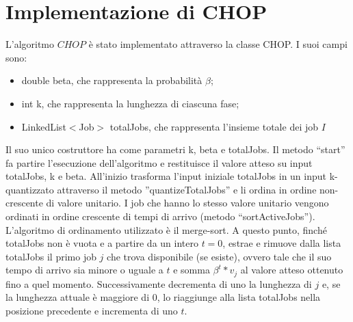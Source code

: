 \documentclass[twoside,openany,titlepage,fleqn,
	headinclude,12pt,a4paper,BCOR5mm,footinclude]{scrbook}
\begin{document}
\section{Implementazione di CHOP}
L’algoritmo $CHOP$ è stato implementato attraverso la classe CHOP. I suoi campi sono:
\begin{itemize}
\item{double beta, che rappresenta la probabilità $\beta$;}
\item{int k, che rappresenta la lunghezza di ciascuna fase;}
\item{LinkedList$<$Job$>$ totalJobs, che rappresenta l’insieme totale dei job $I$}
\end{itemize}
Il suo unico costruttore ha come parametri k, beta e totalJobs. Il metodo “start” fa partire l’esecuzione dell’algoritmo e restituisce il valore atteso su input totalJobs, k e beta. All'inizio trasforma l'input iniziale totalJobs in un input k-quantizzato attraverso il metodo ''quantizeTotalJobs'' e li ordina in ordine non-crescente di valore unitario. I job che hanno lo stesso valore unitario  vengono ordinati in ordine crescente di tempi di arrivo (metodo “sortActiveJobs”). L’algoritmo di ordinamento utilizzato è il merge-sort. A questo punto, finché totalJobs non è vuota e a partire da un intero $t = 0$, estrae e rimuove dalla lista totalJobs il primo job $j$ che trova disponibile (se esiste), ovvero tale che il suo tempo di arrivo sia minore o uguale a $t$ e somma $\beta^{t} * v_{j}$ al valore atteso ottenuto fino a quel momento. Successivamente decrementa di uno la lunghezza di $j$ e, se la lunghezza attuale è maggiore di 0, lo riaggiunge alla lista totalJobs nella posizione precedente e incrementa di uno $t$.
\end{document}
